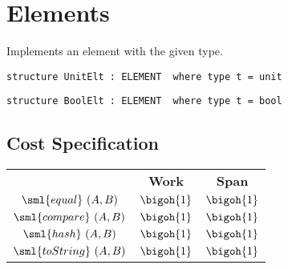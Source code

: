 \chapter{Elements}
\label{ch:elt-structures}

\begin{cluster}
\label{grp:prmbl:elt-structures::implements}

\begin{preamble}
\label{prmbl:elt-structures::implements}
Implements an element with the given type.

\begin{verbatim}
structure UnitElt : ELEMENT  where type t = unit
\end{verbatim}

\begin{verbatim}
structure BoolElt : ELEMENT  where type t = bool
\end{verbatim}

\end{preamble}
\end{cluster}


\section{Cost Specification}
\label{sec:elt-structures::cost-specification}

\begin{cluster}
\label{grp:cost:unit}

\begin{costspec}[UnitElt]
\label{cost:unit}
\begin{tabular}{c|c|c}
& \textbf{Work} & \textbf{Span} \\
$\sml{equal}~(A,B)$ & $\bigoh {1}$ & $\bigoh {1}$ \\
$\sml{compare}~(A,B)$ & $\bigoh {1}$ & $\bigoh {1}$ \\
$\sml{hash}~(A,B)$ & $\bigoh {1}$ & $\bigoh {1}$ \\
$\sml{toString}~(A,B)$ & $\bigoh {1}$ & $\bigoh {1}$ \\
\end{tabular}

\end{costspec}
\end{cluster}

